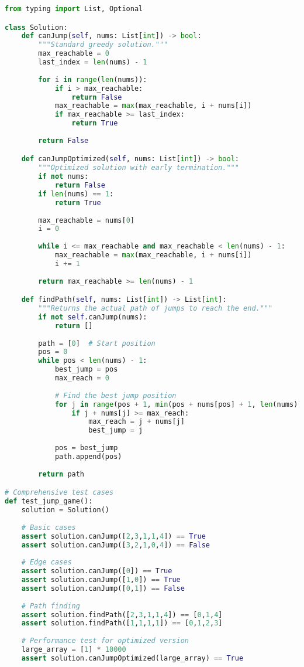 \begin{fullwidth}
\begin{lstlisting}[language=Python]
from typing import List, Optional

class Solution:
    def canJump(self, nums: List[int]) -> bool:
        """Standard greedy solution."""
        max_reachable = 0
        last_index = len(nums) - 1
        
        for i in range(len(nums)):
            if i > max_reachable:
                return False
            max_reachable = max(max_reachable, i + nums[i])
            if max_reachable >= last_index:
                return True
        
        return False

    def canJumpOptimized(self, nums: List[int]) -> bool:
        """Optimized solution with early termination."""
        if not nums:
            return False
        if len(nums) == 1:
            return True
            
        max_reachable = nums[0]
        i = 0
        
        while i <= max_reachable and max_reachable < len(nums) - 1:
            max_reachable = max(max_reachable, i + nums[i])
            i += 1
            
        return max_reachable >= len(nums) - 1

    def findPath(self, nums: List[int]) -> List[int]:
        """Returns the actual path of jumps to reach the end."""
        if not self.canJump(nums):
            return []
            
        path = [0]  # Start position
        pos = 0
        while pos < len(nums) - 1:
            best_jump = pos
            max_reach = 0
            
            # Find the best jump position
            for j in range(pos + 1, min(pos + nums[pos] + 1, len(nums))):
                if j + nums[j] >= max_reach:
                    max_reach = j + nums[j]
                    best_jump = j
                    
            pos = best_jump
            path.append(pos)
            
        return path

# Comprehensive test cases
def test_jump_game():
    solution = Solution()
    
    # Basic cases
    assert solution.canJump([2,3,1,1,4]) == True
    assert solution.canJump([3,2,1,0,4]) == False
    
    # Edge cases
    assert solution.canJump([0]) == True
    assert solution.canJump([1,0]) == True
    assert solution.canJump([0,1]) == False
    
    # Path finding
    assert solution.findPath([2,3,1,1,4]) == [0,1,4]
    assert solution.findPath([1,1,1,1]) == [0,1,2,3]
    
    # Performance test for optimized version
    large_array = [1] * 10000
    assert solution.canJumpOptimized(large_array) == True
\end{lstlisting}
\end{fullwidth}

